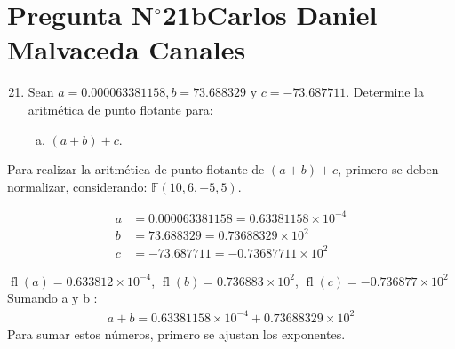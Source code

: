 \section{Pregunta N$^{\circ}$21b\qquad Carlos Daniel Malvaceda Canales}

\begin{frame}
	\begin{enumerate}\setcounter{enumi}{20}
		\item

		      Sean $a=0.000063381158, b=73.688329$ y $c=-73.687711$.
		      Determine la aritmética de punto flotante para:

		      \begin{enumerate}[b)]
			      \item

			            \begin{math}
				            \left(a+b\right)+c
			            \end{math}.
		      \end{enumerate}
	\end{enumerate}

	\begin{solution}
		\begin{enumerate}[b)]

			Para realizar la aritmética de punto flotante de
			\begin{math}
				\left(a+b\right)+c
			\end{math},
			primero se deben normalizar, considerando:
			\begin{math}
				\mathbb{F}\left(10,6,-5,5\right)
			\end{math}.

			\begin{align*}
				a & =0.000063381158=0.63381158 \times 10^{-4} \\
				b & =73.688329=0.73688329\times 10^{2}        \\
				c & =-73.687711=-0.73687711\times 10^{2}
			\end{align*}

			\begin{math}
				\operatorname{fl}\left(a\right)=
				0.633812\times 10^{-4}
			\end{math},
			\begin{math}
				\operatorname{fl}\left(b\right)=
				0.736883\times 10^{2}
			\end{math},
			\begin{math}
				\operatorname{fl}\left(c\right)=
				-0.736877\times 10^{2}
			\end{math}
			\\Sumando a y b :
			\begin{align*}
				a + b = 0.63381158 \times 10^{-4} +  0.73688329 \times 10^{2}
			\end{align*}
			Para sumar estos números, primero se ajustan los exponentes.
		\end{enumerate}
	\end{solution}
\end{frame}
